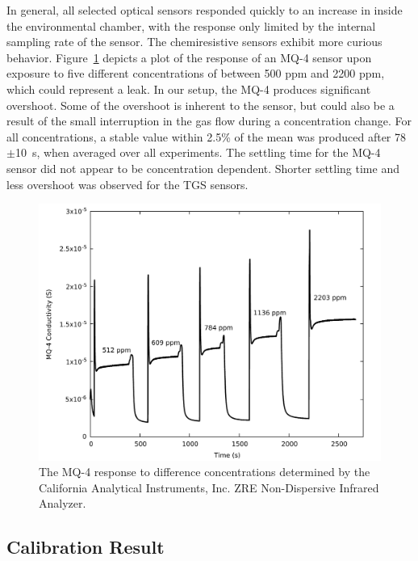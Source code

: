 \documentclass[sensors,article,submit,moreauthors,pdftex]{Definitions/mdpi}
\begin{document}
			In general, all selected optical sensors responded quickly to an increase in  inside the environmental chamber, with the response only limited by the internal sampling rate of the sensor.  
			The chemiresistive sensors exhibit more curious behavior.
			Figure~\ref{fig:mq4step} depicts a plot of the response of an MQ-4 sensor upon exposure to five different concentrations of  between 500 ppm and 2200 ppm, which could represent a  leak.
			In our setup, the MQ-4 produces significant overshoot.
			Some of the overshoot is inherent to the sensor, but could also be a result of the small interruption in the gas flow during a concentration change.
			For all concentrations, a stable value within 2.5\% of the mean was produced after 78$\pm$\SI{10}{\second}, when averaged over all experiments.
			The settling time for the MQ-4 sensor did not appear to be concentration dependent. Shorter settling time and less overshoot was observed for the TGS sensors.
			
			\begin{figure}[!t]
				\centering
				\includegraphics[width=\columnwidth]{honey6.pdf}
				\caption{The MQ-4 response to difference  concentrations determined by the California Analytical Instruments, Inc. ZRE Non-Dispersive Infrared Analyzer.}
				\label{fig:mq4step}
			\end{figure}
			
		\subsection{Calibration Result}
			\label{sec:calibration}
\end{document}
